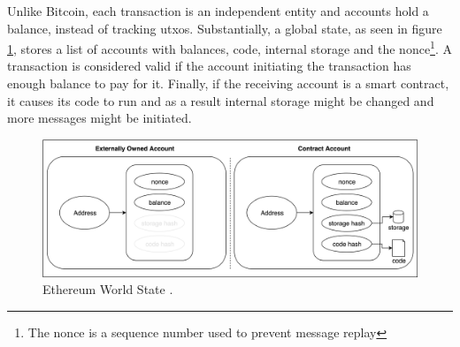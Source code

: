 Unlike Bitcoin, each transaction is an independent entity and accounts hold a balance, instead of tracking \acrshort{utxo}s. Substantially, a global state, as seen in figure \ref{fig:eth-world-state}, stores a list of accounts with balances, code, internal storage and the nonce\footnote{The nonce is a sequence number used to prevent message replay}. A transaction is considered valid if the account initiating the transaction has enough balance to pay for it. Finally, if the receiving account is a smart contract, it causes its code to run and as a result internal storage might be changed and more messages might be initiated.
\begin{figure}[H]
    \centering
    \includegraphics[width=1\textwidth]{images/world-state.png}
    \caption{Ethereum World State \cite{eth-illustrated}.}
    \label{fig:eth-world-state}
\end{figure}